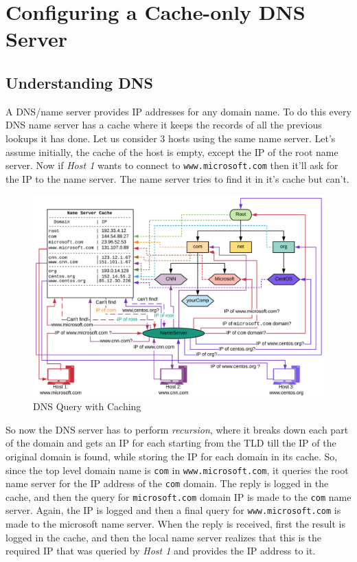 \chapter{Configuring a Cache-only DNS Server}

	\section{Understanding DNS}
A DNS/name server provides IP addresses for any domain name. To do this every DNS name server has a cache where it keeps the records of all the previous lookups it has done. Let us consider 3 hosts using the same name server. Let's assume initially, the cache of the host is empty, except the IP of the root name server. Now if \textit{Host 1} wants to connect to \verb|www.microsoft.com| then it'll ask for the IP to the name server. The name server tries to find it in it's cache but can't.  

\begin{figure}[H]
	\centering
	\includegraphics[width=1\linewidth]{Mod3/chapters/3.10.a}
	\caption{DNS Query with Caching}
	\label{fig:3}
\end{figure}

So now the DNS server has to perform \textit{recursion}, where it breaks down each part of the domain and gets an IP for each starting from the TLD till the IP of the original domain is found, while storing the IP for each domain in its cache. So, since the top level domain name is \verb|com| in \verb|www.microsoft.com|, it queries the root name server for the IP address of the \verb|com| domain. The reply is logged in the cache, and then the query for \verb|microsoft.com| domain IP is made to the \verb|com| name server. Again, the IP is logged and then a final query for \verb|www.microsoft.com| is made to the microsoft name server. When the reply is received, first the result is logged in the cache, and then the local name server realizes that this is the required IP that was queried by \textit{Host 1} and provides the IP address to it.

